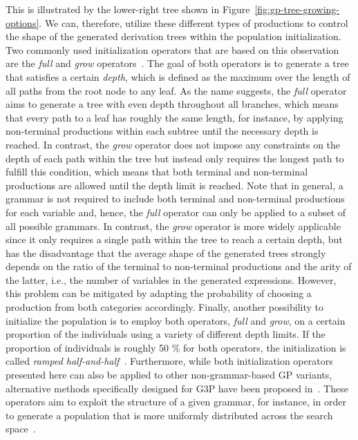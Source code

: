 This is illustrated by the lower-right tree shown in Figure~\ref{fig:gp-tree-growing-options}. 
We can, therefore, utilize these different types of productions to control the shape of the generated derivation trees within the population initialization.
Two commonly used initialization operators that are based on this observation are the \emph{full} and \emph{grow} operators~\cite{poli2008field}.  
The goal of both operators is to generate a tree that satisfies a certain \emph{depth}, which is defined as the maximum over the length of all paths from the root node to any leaf.
As the name suggests, the \emph{full} operator aims to generate a tree with even depth throughout all branches, which means that every path to a leaf has roughly the same length, for instance, by applying non-terminal productions within each subtree until the necessary depth is reached.
In contrast, the \emph{grow} operator does not impose any constraints on the depth of each path within the tree but instead only requires the longest path to fulfill this condition, which means that both terminal and non-terminal productions are allowed until the depth limit is reached.
Note that in general, a grammar is not required to include both terminal and non-terminal productions for each variable and, hence, the \emph{full} operator can only be applied to a subset of all possible grammars.
In contrast, the \emph{grow} operator is more widely applicable since it only requires a single path within the tree to reach a certain depth, but has the disadvantage that the average shape of the generated trees strongly depends on the ratio of the terminal to non-terminal productions and the arity of the latter, i.e., the number of variables in the generated expressions.
However, this problem can be mitigated by adapting the probability of choosing a production from both categories accordingly. 
Finally, another possibility to initialize the population is to employ both operators, \emph{full} and \emph{grow}, on a certain proportion of the individuals using a variety of different depth limits. 
If the proportion of individuals is roughly 50 \% for both operators, the initialization is called \emph{ramped half-and-half}~\cite{poli2008field,koza1994genetic}.
Furthermore, while both initialization operators presented here can also be applied to other non-grammar-based GP variants, alternative methods specifically designed for G3P have been proposed in~\cite{garcia2006initialization,criado2020grammatically}.
These operators aim to exploit the structure of a given grammar, for instance, in order to generate a population that is more uniformly distributed across the search space~\cite{criado2020grammatically}.

